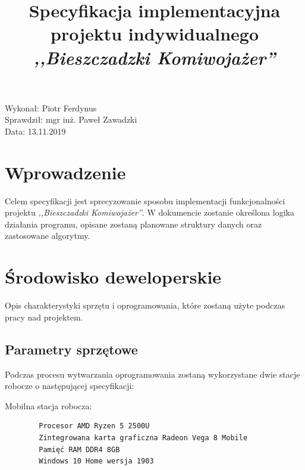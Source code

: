 \documentclass{article}
\title{Specyfikacja implementacyjna projektu indywidualnego \textit{,,Bieszczadzki Komiwojażer''}}
\begin{document}
\begin{titlepage}
\makeatletter
\noindent
\vspace{25pt}
\begin{center}
\Large\textsc{\@title}
\end{center}
\makeatother
\vspace{300pt}
\begin{flushright}
\noindent Wykonał: Piotr Ferdynus\\
Sprawdził: mgr inż. Paweł Zawadzki\\
Data: 13.11.2019\\
\end{flushright}


\thispagestyle{empty}
\end{titlepage}

\lhead{}
\cfoot{\thepage \hspace{1pt} / \pageref{LastPage}}
\setcounter{page}{2}

\section{Wprowadzenie}

Celem specyfikacji jest sprecyzowanie sposobu implementacji funkcjonalności projektu \textit{,,Bieszczadzki Komiwojażer''}. W dokumencie zostanie określona logika działania programu, opisane zostaną planowane struktury danych oraz zastosowane algorytmy.


\section{Środowisko deweloperskie}
Opis charakterystyki sprzętu i oprogramowania, które zostaną użyte podczas pracy nad projektem.

\subsection{Parametry sprzętowe}
Podczas procesu wytwarzania oprogramowania zostaną wykorzystane dwie stacje robocze o następującej specyfikacji:

    Mobilna stacja robocza:
\vspace{-8pt}    
\begin{verbatim}
        Procesor AMD Ryzen 5 2500U
        Zintegrowana karta graficzna Radeon Vega 8 Mobile
        Pamięć RAM DDR4 8GB
        Windows 10 Home wersja 1903
\end{verbatim}    
\end{document}
